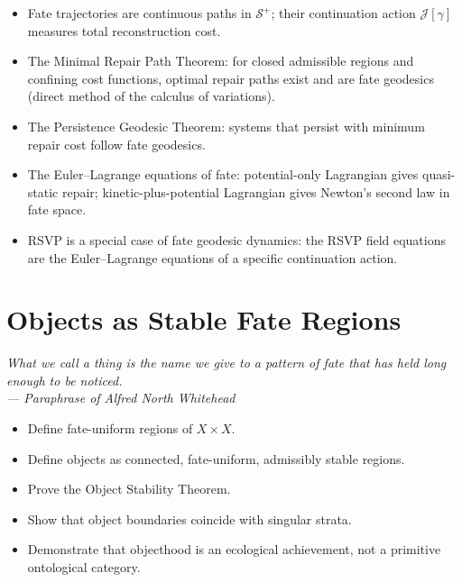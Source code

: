 \documentclass[12pt,twoside,openright]{book}
\newcommand{\distPairs}{X\times X}
\newcommand{\fateSpace}{\mathcal{S}}
\newenvironment{epigraph}[2]{%
  \vspace{1em}\begin{flushright}
  \begin{minipage}{0.72\textwidth}
  \itshape\small #1\\[0.4em]
  \upshape\footnotesize\sffamily\color{DistGray}--- #2
  \end{minipage}\end{flushright}\vspace{1.5em}}{}
\newenvironment{objectives}{%
  \begin{tcolorbox}[colback=DistBlue!5,colframe=DistBlue,
    title={\faCheckCircle\enspace Chapter Objectives},
    fonttitle=\sffamily\bfseries\color{white},
    attach boxed title to top left={yshift=-2mm,xshift=4mm},
    boxed title style={colback=DistBlue},breakable]
  \begin{itemize}[leftmargin=*,nosep]}{%
  \end{itemize}\end{tcolorbox}\vspace{1em}}
\newenvironment{chapsummary}{%
  \begin{tcolorbox}[colback=DistBlue!5,colframe=DistBlue,
    title={\faBookOpen\enspace Summary},
    fonttitle=\sffamily\bfseries\color{white},
    attach boxed title to top left={yshift=-2mm,xshift=4mm},
    boxed title style={colback=DistBlue,rounded corners}]
  \begin{itemize}[nosep,leftmargin=*]}{%
  \end{itemize}\end{tcolorbox}}
\providecommand{\fatePos}{\fateSpace^{+}}
\providecommand{\contAction}{\mathcal{J}}
\providecommand{\fateTraj}{\gamma}
\begin{document}
\begin{chapsummary}
\item Fate trajectories are continuous paths in $\fatePos$;
  their continuation action $\contAction[\fateTraj]$ measures
  total reconstruction cost.
\item The Minimal Repair Path Theorem: for closed admissible
  regions and confining cost functions, optimal repair paths
  exist and are fate geodesics (direct method of the calculus
  of variations).
\item The Persistence Geodesic Theorem: systems that persist
  with minimum repair cost follow fate geodesics.
\item The Euler--Lagrange equations of fate: potential-only
  Lagrangian gives quasi-static repair; kinetic-plus-potential
  Lagrangian gives Newton's second law in fate space.
\item RSVP is a special case of fate geodesic dynamics: the
  RSVP field equations are the Euler--Lagrange equations of a
  specific continuation action.
\end{chapsummary}


\chapter{Objects as Stable Fate Regions}
\label{ch:objects}

\begin{epigraph}{What we call a thing is the name we give to a
  pattern of fate that has held long enough to be noticed.}%
  {Paraphrase of Alfred North Whitehead}
\end{epigraph}

\begin{objectives}
\item Define fate-uniform regions of $\distPairs$.
\item Define objects as connected, fate-uniform, admissibly
  stable regions.
\item Prove the Object Stability Theorem.
\item Show that object boundaries coincide with singular strata.
\item Demonstrate that objecthood is an ecological achievement,
  not a primitive ontological category.
\end{objectives}
\end{document}
